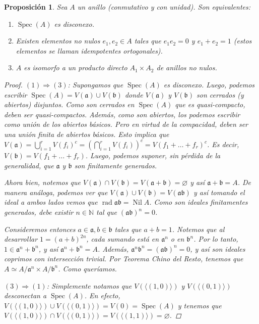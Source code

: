 \documentclass[11pt,a4paper, spanish,oneside,fleqn]{article}
\newtheorem{prop}[teo]{Proposición}
\theoremstyle{definition}
\newcommand{\NN}{\mathbb{N}}
\let\emptyset\varnothing
\DeclareMathOperator{\Nil}{Nil}
\DeclareMathOperator{\rad}{rad}
\DeclareMathOperator{\spec}{Spec}
\begin{document}
\begin{prop}
Sea $A$ un anillo (conmutativo y con unidad). Son equivalentes:
\begin{enumerate}
\item $\spec(A)$ es disconexo.
\item Existen elementos no nulos $e_1,e_2\in A$ tales que $e_1e_2 = 0$ y $e_1+e_2=1$ (estos elementos se llaman idempotentes ortogonales).
\item $A$ es isomorfo a un producto directo $A_1\times A_2$ de anillos no nulos.
\end{enumerate}
\begin{proof}
$(1)\Longrightarrow (3)$: Supongamos que $\spec(A)$ es disconexo. Luego, podemos escribir $\spec(A) = V(\mathfrak{a}) \cup V(\mathfrak{b})$ donde $V(\mathfrak{a})$ y $V(\mathfrak{b})$ son cerrados (y abiertos) disjuntos. Como son cerrados en $\spec(A)$ que es quasi-compacto, deben ser quasi-compactos. Además, como son abiertos, los podemos escribir como unión de los abiertos básicos. Pero en virtud de la compacidad, deben ser una unión finita de abiertos básicos. Esto implica que $V(\mathfrak{a}) = \displaystyle\bigcup_{i=1}^r V(f_i)^c = \left(\displaystyle\bigcap_{i=1}^r V(f_i)\right)^c = V(f_1 + \ldots + f_r)^c$. Es decir, $V(\mathfrak{b}) = V(f_1 + \ldots + f_r)$. Luego, podemos suponer, sin pérdida de la generalidad, que $\mathfrak{a}$ y $\mathfrak{b}$ son finitamente generados.

Ahora bien, notemos que $V(\mathfrak{a})\cap V(\mathfrak{b}) = V(\mathfrak{a}+\mathfrak{b}) = \emptyset$ y así $\mathfrak{a}+\mathfrak{b}=A$. De manera análoga, podemos ver que $V(\mathfrak{a})\cup V(\mathfrak{b}) = V(\mathfrak{a}\mathfrak{b})$ y así tomando el ideal a ambos lados vemos que $\rad \mathfrak{a}\mathfrak{b} = \Nil A$. Como son ideales finitamentes generados, debe existir $n\in\NN$ tal que $(\mathfrak{a}\mathfrak{b})^n = 0$.

Consideremos entonces $a\in\mathfrak{a}, b\in\mathfrak{b}$ tales que $a+b=1$. Notemos que al desarrollar $1 = (a+b)^{2n}$, cada sumando está en $\mathfrak{a}^n$ o en $\mathfrak{b}^n$. Por lo tanto, $1 \in \mathfrak{a}^n + \mathfrak{b}^n$, y así $\mathfrak{a}^n + \mathfrak{b}^n = A$. Además, $\mathfrak{a}^n\mathfrak{b}^n = (\mathfrak{a}\mathfrak{b})^n = 0$, y así son ideales coprimos con intersección trivial. Por Teorema Chino del Resto, tenemos que $A \simeq A/\mathfrak{a}^n \times A/\mathfrak{b}^n$. Como queríamos.

$(3)\Longrightarrow (1)$: Simplemente notamos que $V(\langle (1,0)\rangle)$ y $V(\langle (0,1)\rangle)$ desconectan a $\spec(A)$. En efecto, $V(\langle (1,0)\rangle) \cup V(\langle (0,1)\rangle) = V(0) = \spec(A)$ y tenemos que $V(\langle (1,0)\rangle)\cap V(\langle (0,1)\rangle) = V(\langle (1,1)\rangle) = \emptyset$.


\end{proof}
\end{prop}
\end{document}
